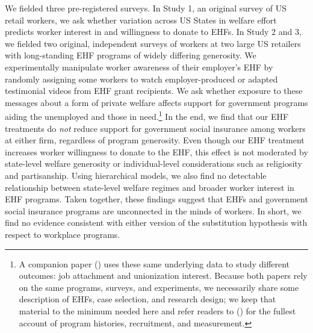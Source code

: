 \documentclass[
  11pt,
  oneside]{article}
\begin{document}
We fielded three pre-registered surveys. In Study 1, an original survey of US retail workers, we ask whether variation across US States in welfare effort predicts worker interest in and willingness to donate to EHFs. In Study 2 and 3, we fielded two original, independent surveys of workers at two large US retailers with long-standing EHF programs of widely differing generosity. We experimentally manipulate worker awareness of their employer's EHF by randomly assigning some workers to watch employer-produced or adapted testimonial videos from EHF grant recipients. We ask whether exposure to these messages about a form of private welfare affects support for government programs aiding the unemployed and those in need.\footnote{A companion paper () uses these same underlying data to study different outcomes: job attachment and unionization interest. Because both papers rely on the same programs, surveys, and experiments, we necessarily share some description of EHFs, case selection, and research design; we keep that material to the minimum needed here and refer readers to () for the fullest account of program histories, recruitment, and measurement.} In the end, we find that our EHF treatments do \emph{not} reduce support for government social insurance among workers at either firm, regardless of program generosity. Even though our EHF treatment increases worker willingness to donate to the EHF, this effect is not moderated by state-level welfare generosity or individual-level considerations such as religiosity and partisanship. Using hierarchical models, we also find no detectable relationship between state-level welfare regimes and broader worker interest in EHF programs. Taken together, these findings suggest that EHFs and government social insurance programs are unconnected in the minds of workers. In short, we find no evidence consistent with either version of the substitution hypothesis with respect to workplace programs.
\end{document}
